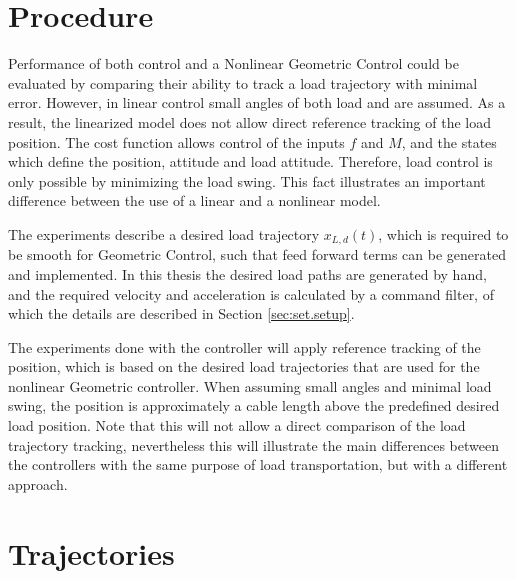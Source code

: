 \section{Procedure}\label{sec:set.proc}
Performance of both  control and a Nonlinear Geometric Control could be evaluated by comparing their ability to track a load trajectory with minimal error. 
However, in linear control small angles of both load and  are assumed. As a result, the linearized model does not allow direct reference tracking of the load position. The  cost function allows control of the inputs $ f $ and $ M $, and the states which define the  position,  attitude and load attitude. Therefore, load control is only possible by minimizing the load swing.
This fact illustrates an important difference between the use of a linear and a nonlinear model. 

The experiments describe a desired load trajectory $ x_{L,d}(t) $, which is required to be smooth for Geometric Control, such that feed forward terms can be generated and implemented. In this thesis the desired load paths are generated by hand, and the required velocity and acceleration is calculated by a command filter, of which the details are described in Section \ref{sec:set.setup}.

The experiments done with the  controller will apply reference tracking of the  position, which is  based on the desired load trajectories that are used for the nonlinear Geometric controller. When assuming small angles and minimal load swing, the  position is approximately a cable length above the predefined desired load position. 
Note that this will not allow a direct comparison of the load trajectory tracking, nevertheless this will illustrate the main differences 
between the controllers with the same purpose of load transportation, but with a different approach.







\section{Trajectories}\label{sec:set.traj}

